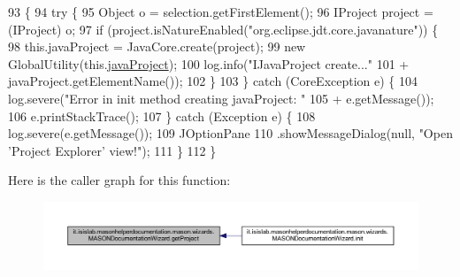 \begin{DoxyCode}
93                                                             \{
94         \textcolor{keywordflow}{try} \{
95             Object o = selection.getFirstElement();
96             IProject project = (IProject) o;
97             \textcolor{keywordflow}{if} (project.isNatureEnabled(\textcolor{stringliteral}{"org.eclipse.jdt.core.javanature"})) \{
98                 this.javaProject = JavaCore.create(project);
99                 \textcolor{keyword}{new} GlobalUtility(this.\hyperlink{classit_1_1isislab_1_1masonhelperdocumentation_1_1mason_1_1wizards_1_1_m_a_s_o_n_documentation_wizard_ab4a56d14d946063217ce087d78f06210}{javaProject});
100                 log.info(\textcolor{stringliteral}{"IJavaProject create..."}
101                         + javaProject.getElementName());
102             \}
103         \} \textcolor{keywordflow}{catch} (CoreException e) \{
104             log.severe(\textcolor{stringliteral}{"Error in init method creating javaProject: "}
105                     + e.getMessage());
106             e.printStackTrace();
107         \} \textcolor{keywordflow}{catch} (Exception e) \{
108             log.severe(e.getMessage());
109             JOptionPane
110                     .showMessageDialog(null, \textcolor{stringliteral}{"Open 'Project Explorer' view!"});
111         \}
112     \}
\end{DoxyCode}


Here is the caller graph for this function\-:\nopagebreak
\begin{figure}[H]
\begin{center}
\leavevmode
\includegraphics[width=350pt]{classit_1_1isislab_1_1masonhelperdocumentation_1_1mason_1_1wizards_1_1_m_a_s_o_n_documentation_wizard_a70caf610771efa8c826aaf0d8b1dafef_icgraph}
\end{center}
\end{figure}


